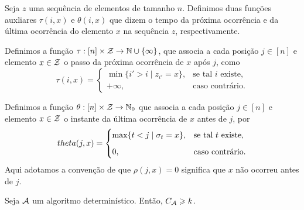 Seja \(z\) uma sequência de elementos de tamanho \(n\). Definimos duas funções auxliares \(\tau(i,x)\) e \(\theta(i,x)\) que dizem o tempo da próxima ocorrência e da última ocorrência do elemento \(x\) na sequência \(z\), respectivamente.

\begin{definition}
 Definimos a função \(\tau : [n] \times \mathcal{Z} \to \mathbb{N} \cup \{\infty\}\), que associa a cada posição \(j \in [n]\) e elemento \(x \in \mathcal{Z}\) o passo da próxima ocorrência de \(x\) após \(j\), como
\begin{equation}
\tau(i, x) =
\begin{cases}
  \min \{ i' > i \mid z_{i'} = x \}, & \text{se tal } i \text{ existe}, \\
  +\infty, & \text{caso contrário}.
\end{cases}
\end{equation}
\end{definition}

\begin{definition}
Definimos a função \(\theta : [n] \times \mathcal{Z} \to \mathbb{N}_0\) que associa a cada posição \(j \in [n]\) e elemento \(x \in \mathcal{Z}\) o instante da última ocorrência de \(x\) antes de \(j\), por
\begin{equation}
\\theta(j, x) =
\begin{cases}
  \max\{ t < j \mid \sigma_t = x \}, & \text{se tal } t \text{ existe}, \\[6pt]
  0, & \text{caso contrário}.
\end{cases}
\end{equation}
Aqui adotamos a convenção de que \(\rho(j,x)=0\) significa que \(x\) não ocorreu antes de \(j\).
\end{definition}

\begin{theorem}
\label{teo:cota_det}
Seja \(\mathcal{A}\) um algoritmo determinístico. Então, \(C_{\mathcal{A}} \geqslant k\).
\end{theorem}

